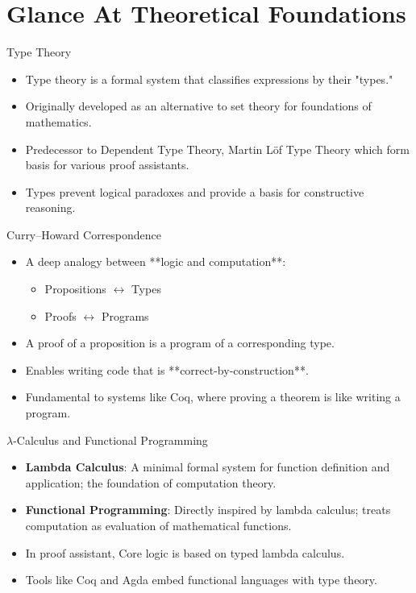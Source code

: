 \documentclass{beamer}
\begin{document}
\section{Glance At Theoretical Foundations}
\begin{frame}{Type Theory}
\begin{itemize}
  \item Type theory is a formal system that classifies expressions by their "types."
  \item Originally developed as an alternative to set theory for foundations of mathematics.
  \item Predecessor to Dependent Type Theory, Martin Löf Type Theory which form basis for various proof assistants.
  \item Types prevent logical paradoxes and provide a basis for constructive reasoning.
\end{itemize}
\end{frame}
\begin{frame}{Curry–Howard Correspondence}
\begin{itemize}
  \item A deep analogy between **logic and computation**:
  \begin{itemize}
    \item Propositions $\leftrightarrow$ Types
    \item Proofs $\leftrightarrow$ Programs
  \end{itemize}
  \item A proof of a proposition is a program of a corresponding type.
  \item Enables writing code that is **correct-by-construction**.
  \item Fundamental to systems like Coq, where proving a theorem is like writing a program.
\end{itemize}
\end{frame}
\begin{frame}{$\lambda$-Calculus and Functional Programming}
    \begin{itemize}
        \item \textbf{Lambda Calculus}: A minimal formal system for function definition and application; the foundation of computation theory.
  \item \textbf{Functional Programming}: Directly inspired by lambda calculus; treats computation as evaluation of mathematical functions.

  \item In proof assistant, Core logic is based on typed lambda calculus.
      \item Tools like Coq and Agda embed functional languages with type theory.
    \end{itemize}
\end{frame}
\end{document}
